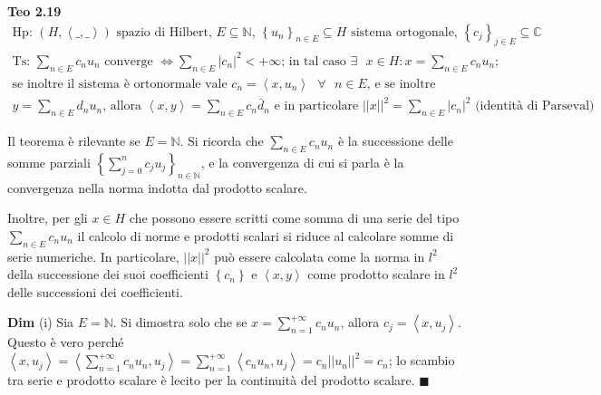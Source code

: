 \documentclass{article}
\begin{document}
\textbf{Teo 2.19 }%
\begin{gather*}
\text{Hp: }\left( H,\left\langle \_,\_\right\rangle \right) \text{ spazio di
Hilbert, }E\subseteq 
\mathbb{N}
\text{, }\left\{ u_{n}\right\} _{n\in E}\subseteq H\text{ sistema
ortogonale, }\left\{ c_{j}\right\} _{j\in E}\subseteq 
\mathbb{C}
\text{ } \\
\text{Ts: }\sum_{n\in E}c_{n}u_{n}\text{ converge }\Longleftrightarrow
\sum_{n\in E}\left\vert c_{n}\right\vert ^{2}<+\infty \text{; in tal caso }%
\exists \text{ }x\in H:x=\sum_{n\in E}c_{n}u_{n}\text{;} \\
\text{se inoltre il sistema \`{e} ortonormale vale }c_{n}=\left\langle
x,u_{n}\right\rangle \text{ }\forall \text{ }n\in E\text{, e se inoltre } \\
y=\sum_{n\in E}d_{n}u_{n}\text{, allora }\left\langle x,y\right\rangle
=\sum_{n\in E}c_{n}\bar{d}_{n}\text{ e in particolare }\left\vert \left\vert
x\right\vert \right\vert ^{2}=\sum_{n\in E}\left\vert c_{n}\right\vert ^{2}%
\text{ (identit\`{a} di Parseval)}
\end{gather*}

Il teorema \`{e} rilevante se $E=%
\mathbb{N}
$. Si ricorda che $\sum_{n\in E}c_{n}u_{n}$ \`{e} la successione delle somme
parziali $\left\{ \sum_{j=0}^{n}c_{j}u_{j}\right\} _{n\in 
\mathbb{N}
}$, e la convergenza di cui si parla \`{e} la convergenza nella norma
indotta dal prodotto scalare.

Inoltre, per gli $x\in H$ che possono essere scritti come somma di una serie
del tipo $\sum_{n\in E}c_{n}u_{n}$ il calcolo di norme e prodotti scalari si
riduce al calcolare somme di serie numeriche. In particolare, $\left\vert
\left\vert x\right\vert \right\vert ^{2}$ pu\`{o} essere calcolata come la
norma in $l^{2}$ della successione dei suoi coefficienti $\left\{
c_{n}\right\} $ e $\left\langle x,y\right\rangle $ come prodotto scalare in $%
l^{2}$ delle successioni dei coefficienti.

\textbf{Dim} (i) Sia $E=%
\mathbb{N}
$. Si dimostra solo che se $x=\sum_{n=1}^{+\infty }c_{n}u_{n}$, allora $%
c_{j}=\left\langle x,u_{j}\right\rangle $. Questo \`{e} vero perch\'{e} $%
\left\langle x,u_{j}\right\rangle =\left\langle \sum_{n=1}^{+\infty
}c_{n}u_{n},u_{j}\right\rangle =\sum_{n=1}^{+\infty }\left\langle
c_{n}u_{n},u_{j}\right\rangle =c_{n}\left\vert \left\vert u_{n}\right\vert
\right\vert ^{2}=c_{n}$; lo scambio tra serie e prodotto scalare \`{e}
lecito per la continuit\`{a} del prodotto scalare. $\blacksquare $
\end{document}
